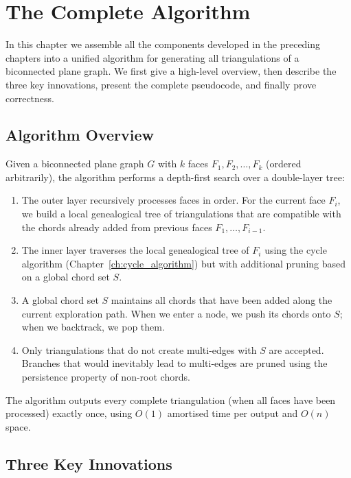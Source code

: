 
\chapter{The Complete Algorithm}
\label{ch:complete_algorithm}

In this chapter we assemble all the components developed in the preceding chapters into a unified algorithm for generating all triangulations of a biconnected plane graph. 
We first give a high-level overview, then describe the three key innovations, present the complete pseudocode, and finally prove correctness.

\section{Algorithm Overview}
\label{sec:algorithm_overview}

Given a biconnected plane graph \(G\) with \(k\) faces \(F_1, F_2, \dots, F_k\) (ordered arbitrarily), the algorithm performs a depth-first search over a double-layer tree:

\begin{enumerate}
    \item The outer layer recursively processes faces in order. 
    For the current face \(F_i\), we build a local genealogical tree of triangulations that are compatible with the chords already added from previous faces \(F_1, \dots, F_{i-1}\).
    \item The inner layer traverses the local genealogical tree of \(F_i\) using the cycle algorithm (Chapter~\ref{ch:cycle_algorithm}) but with additional pruning based on a global chord set \(S\).
    \item A global chord set \(S\) maintains all chords that have been added along the current exploration path. 
    When we enter a node, we push its chords onto \(S\); when we backtrack, we pop them.
    \item Only triangulations that do not create multi-edges with \(S\) are accepted. 
    Branches that would inevitably lead to multi-edges are pruned using the persistence property of non-root chords.
\end{enumerate}

The algorithm outputs every complete triangulation (when all faces have been processed) exactly once, using \(O(1)\) amortised time per output and \(O(n)\) space.

\section{Three Key Innovations}
\label{sec:innovations}

